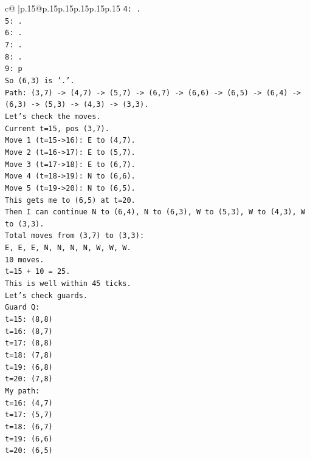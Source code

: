 \documentclass{article}
\begin{document}
{\begin{supertabular}{c@{$\;$}|p{.15\linewidth}@{}p{.15\linewidth}p{.15\linewidth}p{.15\linewidth}p{.15\linewidth}p{.15\linewidth}}
{{{\texttt{4: .} \\
\texttt{5: .} \\
\texttt{6: .} \\
\texttt{7: .} \\
\texttt{8: .} \\
\texttt{9: p} \\
\texttt{So (6,3) is '.'.} \\
\texttt{Path: (3,7) {-}> (4,7) {-}> (5,7) {-}> (6,7) {-}> (6,6) {-}> (6,5) {-}> (6,4) {-}> (6,3) {-}> (5,3) {-}> (4,3) {-}> (3,3).} \\
\texttt{Let's check the moves.} \\
\texttt{Current t=15, pos (3,7).} \\
\texttt{Move 1 (t=15{-}>16): E to (4,7).} \\
\texttt{Move 2 (t=16{-}>17): E to (5,7).} \\
\texttt{Move 3 (t=17{-}>18): E to (6,7).} \\
\texttt{Move 4 (t=18{-}>19): N to (6,6).} \\
\texttt{Move 5 (t=19{-}>20): N to (6,5).} \\
\texttt{This gets me to (6,5) at t=20.} \\
\texttt{Then I can continue N to (6,4), N to (6,3), W to (5,3), W to (4,3), W to (3,3).} \\
\texttt{Total moves from (3,7) to (3,3):} \\
\texttt{E, E, E, N, N, N, N, W, W, W.} \\
\texttt{10 moves.} \\
\texttt{t=15 + 10 = 25.} \\
\texttt{This is well within 45 ticks.} \\
\texttt{Let's check guards.} \\
\texttt{Guard Q:} \\
\texttt{t=15: (8,8)} \\
\texttt{t=16: (8,7)} \\
\texttt{t=17: (8,8)} \\
\texttt{t=18: (7,8)} \\
\texttt{t=19: (6,8)} \\
\texttt{t=20: (7,8)} \\
\texttt{My path:} \\
\texttt{t=16: (4,7)} \\
\texttt{t=17: (5,7)} \\
\texttt{t=18: (6,7)} \\
\texttt{t=19: (6,6)} \\
\texttt{t=20: (6,5)} \\
}}}
\end{supertabular}}
\end{document}

